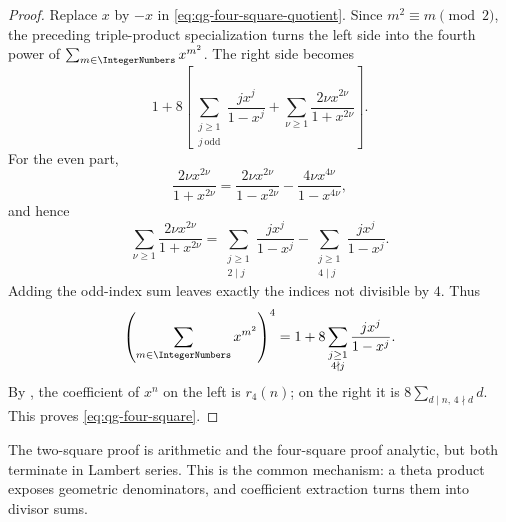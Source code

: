 \begin{proof}
Replace $x$ by $-x$ in \eqref{eq:qg-four-square-quotient}.  Since
$m^2\equiv m\pmod2$, the preceding triple-product specialization turns the
left side into the fourth power of
$\sum_{m\in\IntegerNumbers}x^{m^2}$.  The right side becomes
\[
 1+8\left[
 \sum_{\substack{j\ge1\\j\ \mathrm{odd}}}
  \frac{jx^j}{1-x^j}
 +\sum_{\nu\ge1}\frac{2\nu x^{2\nu}}{1+x^{2\nu}}
 \right].
\]
For the even part,
\[
 \frac{2\nu x^{2\nu}}{1+x^{2\nu}}
 =\frac{2\nu x^{2\nu}}{1-x^{2\nu}}
  -\frac{4\nu x^{4\nu}}{1-x^{4\nu}},
\]
and hence
\[
 \sum_{\nu\ge1}\frac{2\nu x^{2\nu}}{1+x^{2\nu}}
 =\sum_{\substack{j\ge1\\2\mid j}}\frac{jx^j}{1-x^j}
  -\sum_{\substack{j\ge1\\4\mid j}}\frac{jx^j}{1-x^j}.
\]
Adding the odd-index sum leaves exactly the indices not divisible by $4$.
Thus
\begin{equation}
 \left(\sum_{m\in\IntegerNumbers}x^{m^2}\right)^4
 =1+8\sum_{\substack{j\ge1\\4\nmid j}}
 \frac{jx^j}{1-x^j}.
\label{eq:qg-four-square-lambert}
\end{equation}
By , the coefficient of $x^n$ on the left is
$r_4(n)$; on the right it is
$8\sum_{d\mid n,\,4\nmid d}d$.  This proves
\eqref{eq:qg-four-square}.
\end{proof}

\begin{remark}
The two-square proof is arithmetic and the four-square proof analytic, but
both terminate in Lambert series.  This is the common mechanism: a theta
product exposes geometric denominators, and coefficient extraction turns
them into divisor sums.
\end{remark}
